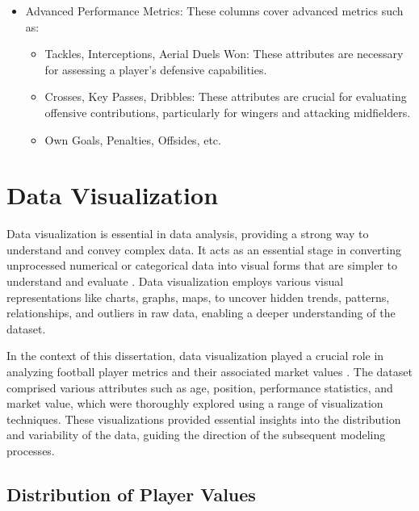 \documentclass[12pt, a4paper,oneside]{book}
\numberwithin{equation}{section}
\begin{document}
\begin{itemize}
\begin{itemize}
        \item Assists(Ast): The number of assists provided
        \item Min: Total minutes spent on the field during the season.
        \item Yellow Cards, Red Cards, Fouls, etc.
    \end{itemize}
    \item Advanced Performance Metrics: These columns cover advanced metrics such as:
    \begin{itemize}
        \item Tackles, Interceptions, Aerial Duels Won: These attributes are necessary for assessing a player's defensive capabilities.
        \item Crosses, Key Passes, Dribbles: These attributes are crucial for evaluating offensive contributions, particularly for wingers and attacking midfielders.
        \item Own Goals, Penalties, Offsides, etc.
    \end{itemize}
\end{itemize}

\section{Data Visualization}\label{sec:4.2}

Data visualization is essential in data analysis, providing a strong way to understand and convey complex data. It acts as an essential stage in converting unprocessed numerical or categorical data into visual forms that are simpler to understand and evaluate \cite{tufte2001}. Data visualization employs various visual representations like charts, graphs, maps, to uncover hidden trends, patterns, relationships, and outliers in raw data, enabling a deeper understanding of the dataset.

In the context of this dissertation, data visualization played a crucial role in analyzing football player metrics and their associated market values \cite{gudmundsson2017}. The dataset comprised various attributes such as age, position, performance statistics, and market value, which were thoroughly explored using a range of visualization techniques. These visualizations provided essential insights into the distribution and variability of the data, guiding the direction of the subsequent modeling processes.

\subsection{Distribution of Player Values}\label{sec:4.2.1}
\end{document}
